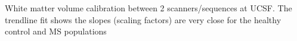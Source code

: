 \label{fig:hcms_WMV} White matter volume calibration between 2 scanners/sequences at UCSF. The trendline fit shows the slopes (scaling factors) are very close for the healthy control and MS populations